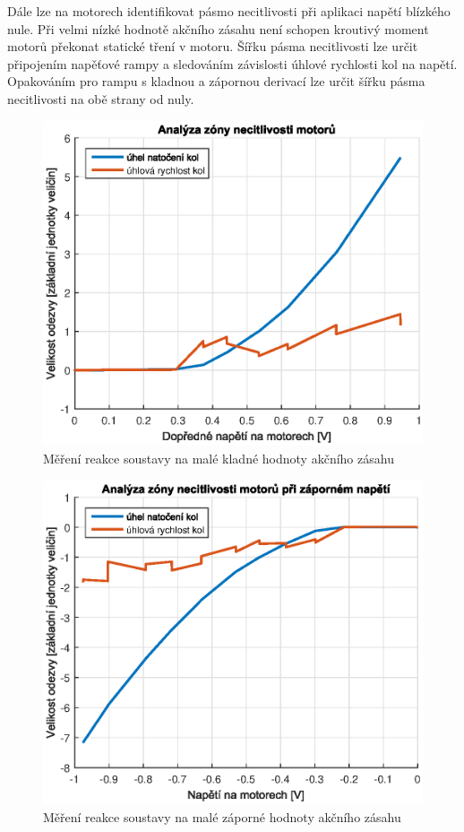 \documentclass[conference]{IEEEtran}
\begin{document}
Dále lze na motorech identifikovat pásmo necitlivosti při aplikaci napětí blízkého nule. Při velmi nízké hodnotě
akčního zásahu není schopen kroutivý moment motorů překonat statické tření v motoru.
Šířku pásma necitlivosti lze určit připojením napěťové rampy a sledováním závislosti úhlové rychlosti kol na napětí.
Opakováním pro rampu s kladnou a zápornou derivací lze určit šířku pásma necitlivosti na obě strany od nuly.

\begin{figure}[htbp]
    \centerline{\includegraphics[width=\linewidth]{deadzone_motory_vpred.eps}}
    \caption{Měření reakce soustavy na malé kladné hodnoty akčního zásahu}
    \label{fig:deadzone_vpred}        
\end{figure}
\begin{figure}[htbp]
    \centerline{\includegraphics[width=\linewidth]{deadzone_motory_vzad.eps}}
    \caption{Měření reakce soustavy na malé záporné hodnoty akčního zásahu}
    \label{fig:deadzone_vzad}        
\end{figure}
\end{document}
